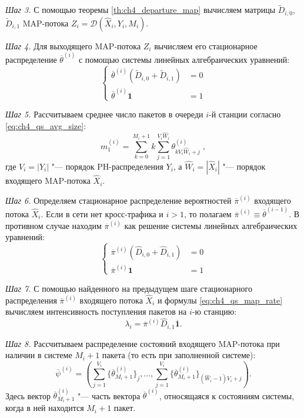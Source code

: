 \textit{Шаг 3.} С помощью теоремы \ref{th:ch4_departure_map} вычисляем матрицы $\tilde{D}_{i,0}$, $\tilde{D}_{i,1}$ MAP-потока $Z_i = \mathcal{D}(\hat{X}_i, Y_i, M_i)$.

\textit{Шаг 4.} Для выходящего MAP-потока $Z_i$ вычисляем его стационарное распределение $\overline{\theta}^{(i)}$ с помощью системы линейных алгебраических уравнений:
$$
  \begin{cases}
	  \overline{\theta}^{(i)}(\tilde{D}_{i,0} + \tilde{D}_{i,1}) &= 0\\
	  \overline{\theta}^{(i)} \mathbf{1} &= 1
  \end{cases}
$$

\textit{Шаг 5.} Рассчитываем среднее число пакетов в очереди $i$-й станции согласно \eqref{eq:ch4_qs_avg_size}:
$$
  m_1^{(i)} = \sum\limits_{k=0}^{M_i + 1} k \sum\limits_{j=1}^{V_i \hat{W}_i} \theta^{(i)}_{k V_i \hat{W}_i + j}\;,
$$
где $V_i = |Y_i|$ "--- порядок PH-распределения $Y_i$, а $\hat{W}_i = |\hat{X}_i|$ "--- порядок входящего MAP-потока $\hat{X}_i$.

\textit{Шаг 6.} Определяем стационарное распределение вероятностей $\overline{\pi}^{(i)}$ входящего потока $\hat{X}_i$. Если в сети нет кросс-трафика и $i > 1$, то полагаем $\overline{\pi}^{(i)} \equiv \overline{\theta}^{(i-1)}$. В противном случае находим $\overline{\pi}^{(i)}$ как решение системы линейных алгебраических уравнений:
$$
  \begin{cases}
	  \overline{\pi}^{(i)}(\hat{D}_{i,0} + \hat{D}_{i,1}) &= 0\\
	  \overline{\pi}^{(i)} \mathbf{1} &= 1
  \end{cases}
$$

\textit{Шаг 7.} С помощью найденного на предыдущем шаге стационарного распределения $\overline{\pi}^{(i)}$ входящего потока $\hat{X}_i$ и формулы \eqref{eq:ch4_qs_map_rate} вычисляем интенсивность поступления пакетов на $i$-ю станцию:
$$
  \lambda_i = \overline{\pi}^{(i)} \hat{D}_{i,1} \overline{\mathbf{1}}.
$$

\textit{Шаг 8.} Рассчитываем распределение состояний входящего MAP-потока при наличии в системе $M_i + 1$ пакета (то есть при заполненной системе):
$$
  \overline{\psi}^{(i)} = \left(
  \sum\limits_{j=1}^{V_i} \{ \overline{\theta}^{(i)}_{M_i+1} \}_j,
  \dots,
  \sum\limits_{j=1}^{V_i} \{ \overline{\theta}^{(i)}_{M_i+1} \}_{(\hat{W}_i-1) V_i + j}
  \right).
$$
Здесь вектор $\overline{\theta}_{M_i+1}^{(i)}$ "--- часть вектора $\overline{\theta}^{(i)}$, относящаяся к состояниям системы, когда в ней находится $M_i + 1$ пакет.

